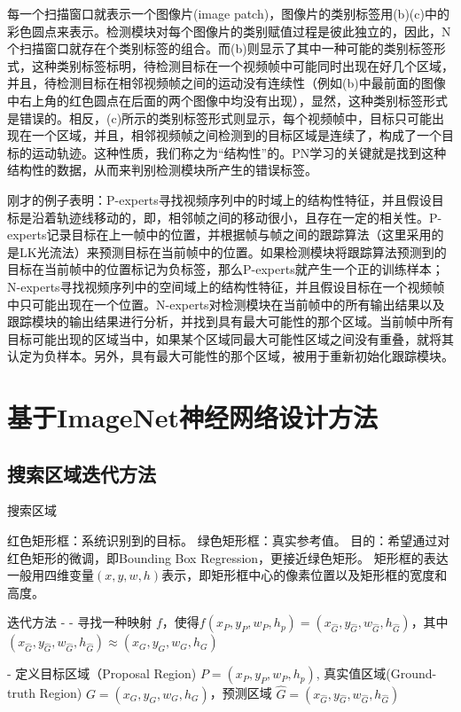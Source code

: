 每一个扫描窗口就表示一个图像片(image patch)，图像片的类别标签用(b)(c)中的彩色圆点来表示。检测模块对每个图像片的类别赋值过程是彼此独立的，因此，N个扫描窗口就存在个类别标签的组合。而(b)则显示了其中一种可能的类别标签形式，这种类别标签标明，待检测目标在一个视频帧中可能同时出现在好几个区域，并且，待检测目标在相邻视频帧之间的运动没有连续性（例如(b)中最前面的图像中右上角的红色圆点在后面的两个图像中均没有出现），显然，这种类别标签形式是错误的。相反，(c)所示的类别标签形式则显示，每个视频帧中，目标只可能出现在一个区域，并且，相邻视频帧之间检测到的目标区域是连续了，构成了一个目标的运动轨迹。这种性质，我们称之为“结构性”的。PN学习的关键就是找到这种结构性的数据，从而来判别检测模块所产生的错误标签。

刚才的例子表明：P-experts寻找视频序列中的时域上的结构性特征，并且假设目标是沿着轨迹线移动的，即，相邻帧之间的移动很小，且存在一定的相关性。P-experts记录目标在上一帧中的位置，并根据帧与帧之间的跟踪算法（这里采用的是LK光流法）来预测目标在当前帧中的位置。如果检测模块将跟踪算法预测到的目标在当前帧中的位置标记为负标签，那么P-experts就产生一个正的训练样本；N-experts寻找视频序列中的空间域上的结构性特征，并且假设目标在一个视频帧中只可能出现在一个位置。N-experts对检测模块在当前帧中的所有输出结果以及跟踪模块的输出结果进行分析，并找到具有最大可能性的那个区域。当前帧中所有目标可能出现的区域当中，如果某个区域同最大可能性区域之间没有重叠，就将其认定为负样本。另外，具有最大可能性的那个区域，被用于重新初始化跟踪模块。

\section{基于ImageNet神经网络设计方法}

\subsection{搜索区域迭代方法}
搜索区域

红色矩形框：系统识别到的目标。
绿色矩形框：真实参考值。
目的：希望通过对红色矩形的微调，即Bounding Box Regression，更接近绿色矩形。
矩形框的表达一般用四维变量$(x, y, w, h)$表示，即矩形框中心的像素位置以及矩形框的宽度和高度。

迭代方法
- - 寻找一种映射 $f$，使得$f(x_P, y_P, w_P, h_p) = (x_{\hat{G}}, y_{\hat{G}}, w_{\hat{G}}, h_{\hat{G}})$，其中$(x_{\hat{G}}, y_{\hat{G}}, w_{\hat{G}}, h_{\hat{G}}) \approx (x_G, y_G, w_G, h_G)$

- 定义目标区域（Proposal Region) $P=(x_P, y_P, w_P, h_p)$, 真实值区域(Ground-truth Region) $G = (x_G, y_G, w_G, h_G)$，预测区域 $\hat{G}=(x_{\hat{G}}, y_{\hat{G}}, w_{\hat{G}}, h_{\hat{G}})$

